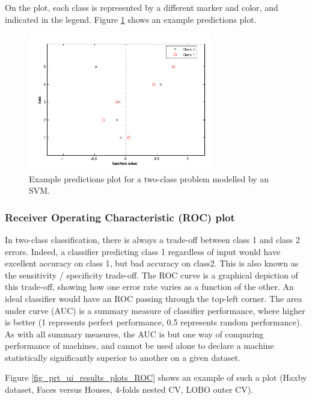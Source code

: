 On the plot, each class is represented by a different marker and color, and indicated in the legend.
Figure \ref{fig_prt_ui_results_plots_pred} shows an example predictions plot. 

\begin{figure}[h!]
\begin{center}
\includegraphics[height=6cm]{images/prt_ui_results_plots_pred.png}
\caption{Example predictions plot for a two-class problem modelled by an SVM.}
\label{fig_prt_ui_results_plots_pred}
\end{center}
\end{figure}

\subsubsection{Receiver Operating Characteristic (ROC) plot}

In two-class classification, there is always a trade-off between class 1
and class 2 errors. Indeed, a classifier predicting class 1 regardless of input
would have excellent accuracy on class 1, but bad accuracy on class2. This is also
known as the sensitivity / specificity trade-off. The 
ROC curve is a graphical depiction of this trade-off, showing how one error rate
varies as a function of the other. An ideal classifier would have an ROC passing
through the top-left corner. The area under curve (AUC) is a summary measure of 
classifier performance, where higher is better (1 represents perfect performance,
0.5 represents random performance). As with all summary measures,
the AUC is but one way of comparing performance of machines, and cannot be used alone
to declare a machine statistically significantly superior to another on a given dataset.

Figure \ref{fig_prt_ui_results_plots_ROC} shows an example of such a plot (Haxby dataset, Faces versus Houses, 4-folds nested CV, LOBO outer CV).

